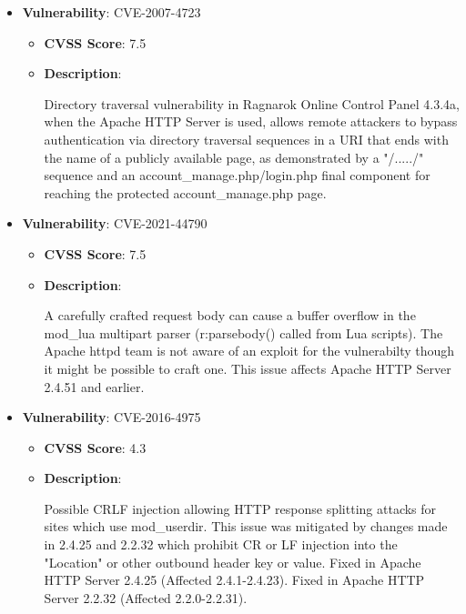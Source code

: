 \documentclass{article}
\begin{document}
\begin{itemize}
        \item \textbf{Vulnerability}: CVE-2007-4723
        \begin{itemize}
            \item \textbf{CVSS Score}:  7.5 
            \item \textbf{Description}:
            \parbox[t]{0.9\linewidth}{
                \ttfamily Directory traversal vulnerability in Ragnarok Online Control Panel 4.3.4a, when the Apache HTTP Server is used, allows remote attackers to bypass authentication via directory traversal sequences in a URI that ends with the name of a publicly available page, as demonstrated by a "/...../" sequence and an account\_manage.php/login.php final component for reaching the protected account\_manage.php page.
            }
        \end{itemize}
    
        \item \textbf{Vulnerability}: CVE-2021-44790
        \begin{itemize}
            \item \textbf{CVSS Score}:  7.5 
            \item \textbf{Description}:
            \parbox[t]{0.9\linewidth}{
                \ttfamily A carefully crafted request body can cause a buffer overflow in the mod\_lua multipart parser (r:parsebody() called from Lua scripts). The Apache httpd team is not aware of an exploit for the vulnerabilty though it might be possible to craft one. This issue affects Apache HTTP Server 2.4.51 and earlier.
            }
        \end{itemize}
    
        \item \textbf{Vulnerability}: CVE-2016-4975
        \begin{itemize}
            \item \textbf{CVSS Score}:  4.3 
            \item \textbf{Description}:
            \parbox[t]{0.9\linewidth}{
                \ttfamily Possible CRLF injection allowing HTTP response splitting attacks for sites which use mod\_userdir. This issue was mitigated by changes made in 2.4.25 and 2.2.32 which prohibit CR or LF injection into the "Location" or other outbound header key or value. Fixed in Apache HTTP Server 2.4.25 (Affected 2.4.1-2.4.23). Fixed in Apache HTTP Server 2.2.32 (Affected 2.2.0-2.2.31).
            }
        \end{itemize}
    

\end{itemize}
\end{document}
